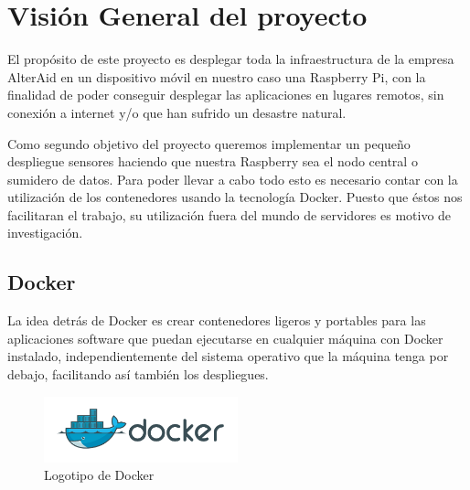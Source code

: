 \chapter{Visión General del proyecto}

El propósito de este proyecto es desplegar toda la infraestructura de la empresa AlterAid en un dispositivo móvil en nuestro caso una Raspberry Pi, con la finalidad de poder conseguir desplegar las aplicaciones en lugares remotos, sin conexión a internet y/o que han sufrido un desastre natural.

Como segundo objetivo del proyecto queremos implementar un pequeño despliegue sensores haciendo que nuestra Raspberry sea el nodo central o sumidero de datos. Para poder llevar a cabo todo esto es necesario contar con la utilización de los contenedores usando la tecnología Docker. Puesto que éstos nos facilitaran el trabajo, su utilización fuera del mundo de servidores es motivo de investigación.

\section{Docker}

La idea detrás de Docker es crear contenedores ligeros y portables para las aplicaciones software que puedan ejecutarse en cualquier máquina con Docker instalado, independientemente del sistema operativo que la máquina tenga por debajo, facilitando así también los despliegues.

\begin{figure}[htb]
\begin{center}
\includegraphics[width=0.5\textwidth]{./setup/dockerLogo}
\caption{Logotipo de Docker}
\label{F:prova}
\end{center}
\end{figure}


